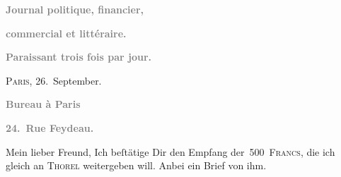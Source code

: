 \pstart
           \begin{otherlanguage}{french}\textcolor{gray}{\textbf{Journal politique,
                        financier,}}\end{otherlanguage}\pend
           
\pstart
           \begin{otherlanguage}{french}\textcolor{gray}{\textbf{commercial et littéraire.}}\end{otherlanguage}\pend
           
\pstart
           \begin{otherlanguage}{french}\textcolor{gray}{\textbf{\textbf{Paraissant trois fois par jour.}}}\end{otherlanguage}\hfill \textsc{Paris}, 26. September.\pend
           
\pstart
           \begin{otherlanguage}{french}\textcolor{gray}{\textbf{\textbf{Bureau à Paris}}}\end{otherlanguage}\pend
           
\pstart
           \begin{otherlanguage}{french}\textcolor{gray}{\textbf{\textbf{24. Rue Feydeau.}}}\end{otherlanguage}\pend
           
\pstart\center{}Mein lieber Freund,\pend\vspace{0.5em}
\pstart
           Ich beſtätige Dir den Empfang der 500 \textsc{Francs}, die ich
               gleich an \textsc{Thorel} weitergeben will. Anbei ein Brief von ihm.\pend
           
